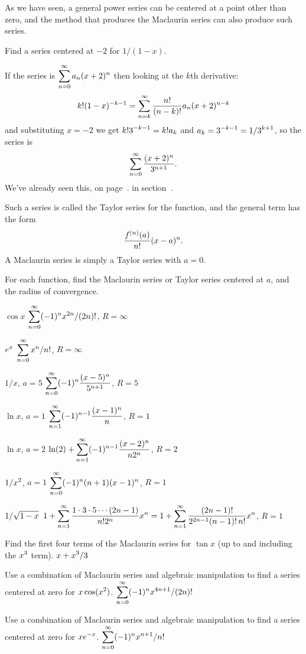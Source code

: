 As we have seen, a general power series can be centered at a point
other than zero, and the method that produces the Maclaurin series can
also produce such series.

\example Find a series centered at $-2$ for $1/(1-x)$.

If the series is $\displaystyle\sum_{n=0}^\infty a_n(x+2)^n$ then looking at the
$k$th derivative:
$$k!(1-x)^{-k-1}=\sum_{n=k}^\infty {n!\over (n-k)!}a_n(x+2)^{n-k}$$
and substituting $x=-2$ we get
$\displaystyle k!3^{-k-1}=k!a_k$ and $\displaystyle a_k=3^{-k-1}=1/3^{k+1}$, so the series is
$$\sum_{n=0}^\infty {(x+2)^n\over 3^{n+1}}.$$
We've already seen this, 
\texonly
on page~.
\endtexonly
\htmlonly
in section~.
\endhtmlonly
\endexample

Such a series is called the 
{\dfont Taylor series\/} 
for the function,
and the general term has the form
$${f^{(n)}(a)\over n!}(x-a)^n.$$
A Maclaurin series is simply a Taylor series with $a=0$.

\exercises

For each function, find the Maclaurin series or Taylor series centered
at $a$, and the radius of convergence.

\exercise $\cos x$
\answer $\displaystyle\sum_{n=0}^\infty (-1)^n x^{2n}/(2n)!$, $R=\infty$
\endanswer
\endexercise

\exercise $\displaystyle e^x$
\answer $\displaystyle\sum_{n=0}^\infty x^n/n!$, $R=\infty$
\endanswer
\endexercise

\exercise $1/x$, $a=5$
\answer $\displaystyle\sum_{n=0}^\infty (-1)^n{(x-5)^n\over 5^{n+1}}$, $R=5$
\endanswer
\endexercise

\exercise $\ln x$, $a=1$
\answer $\displaystyle\sum_{n=1}^\infty (-1)^{n-1}{(x-1)^n\over n}$, $R=1$
\endanswer
\endexercise

\exercise $\ln x$, $a=2$
\answer $\displaystyle\ln(2)+\sum_{n=1}^\infty (-1)^{n-1}{(x-2)^n\over n 2^n}$, $R=2$
\endanswer
\endexercise

\exercise $\displaystyle 1/x^2$, $a=1$
\answer $\displaystyle\sum_{n=0}^\infty (-1)^n(n+1)(x-1)^n$, $R=1$
\endanswer
\endexercise

\exercise $\displaystyle 1/\sqrt{1-x}$
\answer $\displaystyle1+\sum_{n=1}^\infty {1\cdot3\cdot5\cdots(2n-1)\over
n!2^n} x^n=1+\sum_{n=1}^\infty {(2n-1)!\over 2^{2n-1}(n-1)!\,n!}x^n$, $R=1$
\endanswer
\endexercise

\exercise Find the first four terms of the Maclaurin series for $\tan
x$ (up to and including the $\displaystyle x^3$ term).
\answer $\displaystyle x+x^3/3$
\endanswer
\endexercise

\exercise Use a combination of Maclaurin series and algebraic
manipulation to find a series centered at zero for
$\displaystyle x\cos (x^2)$.
\answer $\displaystyle\sum_{n=0}^\infty (-1)^n x^{4n+1}/(2n)!$
\endanswer
\endexercise

\exercise Use a combination of Maclaurin series and algebraic
manipulation to find a series centered at zero for
$\displaystyle xe^{-x}$.
\answer $\displaystyle\sum_{n=0}^\infty (-1)^n x^{n+1}/n!$
\endanswer
\endexercise

\endexercises

